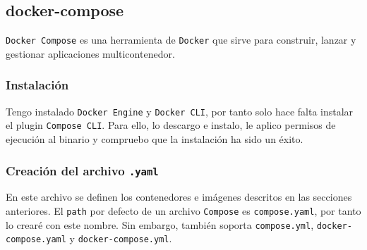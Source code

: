 \subsection{docker-compose}
\par \texttt{Docker Compose} es una herramienta de \texttt{Docker} 
que sirve para construir, lanzar y gestionar
aplicaciones multicontenedor.

\subsubsection{Instalación}
\par Tengo instalado \texttt{Docker Engine} y \texttt{Docker CLI}, por tanto solo 
hace falta instalar el plugin \texttt{Compose CLI}. Para ello, 
lo descargo e instalo, le aplico permisos de ejecución 
al binario y compruebo que la instalación ha sido un éxito. 

\subsubsection{Creación del archivo \texttt{.yaml}}
\par En este archivo se definen los contenedores e imágenes
descritos en las secciones anteriores. 
El \texttt{path} por defecto de un archivo \texttt{Compose}
es \texttt{compose.yaml}, por tanto lo crearé con este nombre. Sin embargo,
también soporta \texttt{compose.yml}, \texttt{docker-compose.yaml} y 
\texttt{docker-compose.yml}.


